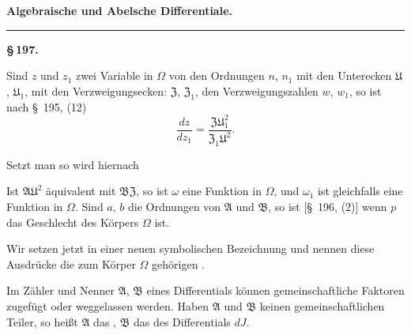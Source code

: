 \begin{center}

\textbf{Algebraische und Abelsche Differentiale.}

\rule{0.3\linewidth}{0.4pt}

\textbf{\S\,197. }
\end{center}

Sind $z$ und $z_1$ zwei Variable in $\Omega$ von den Ordnungen $n$, $n_1$ mit den Unterecken $\mathfrak{U}$, $\mathfrak{U}_1$, mit den Verzweigungsecken: $\mathfrak{Z}$, $\mathfrak{Z}_1$, den Verzweigungszahlen $w$, $w_1$, so ist nach \S\ 195, (12)
\[
\dfrac{dz}{dz_1} = \dfrac{\mathfrak{Z}\mathfrak{U}_1^2}{\mathfrak{Z}_1\mathfrak{U}^2}.
\]

Setzt man
so wird hiernach

Ist $\mathfrak{A}\mathfrak{U}^2$ \"aquivalent mit $\mathfrak{B}\mathfrak{Z}$, so ist $\omega$ eine Funktion in $\Omega$, und $\omega_1$ ist gleichfalls eine Funktion in $\Omega$. Sind $a$, $b$ die Ordnungen von $\mathfrak{A}$ und $\mathfrak{B}$, so ist [\S\ 196, (2)]
wenn $p$ das Geschlecht des K\"orpers $\Omega$ ist.

Wir setzen jetzt in einer neuen symbolischen Bezeichnung
und nennen diese Ausdr\"ucke die zum K\"orper $\Omega$ geh\"origen .

Im Z\"ahler und Nenner $\mathfrak{A}$, $\mathfrak{B}$ eines Differentials k\"onnen gemeinschaftliche Faktoren zugef\"ugt oder weggelassen werden. Haben $\mathfrak{A}$ und $\mathfrak{B}$ keinen gemeinschaftlichen Teiler, so hei\ss{}t $\mathfrak{A}$ das , $\mathfrak{B}$ das  des Differentials $dJ$.
